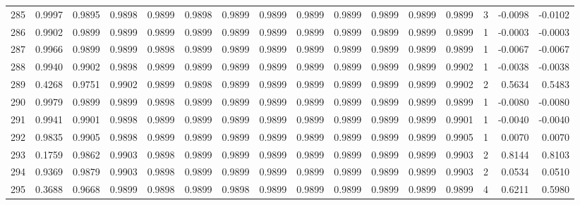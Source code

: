 \begin{tabular}{lrrrrrrrrrrrrrrr}
285 &      0.9997 &  0.9895 &  0.9898 &  0.9899 &  0.9898 &  0.9899 &  0.9899 &  0.9899 &  0.9899 &  0.9899 &   0.9899 &     0.9899 &      3 &                   -0.0098 &                    -0.0102 \\
286 &      0.9902 &  0.9899 &  0.9899 &  0.9899 &  0.9899 &  0.9899 &  0.9899 &  0.9899 &  0.9899 &  0.9899 &   0.9899 &     0.9899 &      1 &                   -0.0003 &                    -0.0003 \\
287 &      0.9966 &  0.9899 &  0.9899 &  0.9898 &  0.9899 &  0.9899 &  0.9899 &  0.9899 &  0.9899 &  0.9899 &   0.9899 &     0.9899 &      1 &                   -0.0067 &                    -0.0067 \\
288 &      0.9940 &  0.9902 &  0.9898 &  0.9899 &  0.9899 &  0.9899 &  0.9899 &  0.9899 &  0.9899 &  0.9899 &   0.9899 &     0.9902 &      1 &                   -0.0038 &                    -0.0038 \\
289 &      0.4268 &  0.9751 &  0.9902 &  0.9899 &  0.9898 &  0.9899 &  0.9899 &  0.9899 &  0.9899 &  0.9899 &   0.9899 &     0.9902 &      2 &                    0.5634 &                     0.5483 \\
290 &      0.9979 &  0.9899 &  0.9899 &  0.9898 &  0.9899 &  0.9899 &  0.9899 &  0.9899 &  0.9899 &  0.9899 &   0.9899 &     0.9899 &      1 &                   -0.0080 &                    -0.0080 \\
291 &      0.9941 &  0.9901 &  0.9898 &  0.9899 &  0.9899 &  0.9899 &  0.9899 &  0.9899 &  0.9899 &  0.9899 &   0.9899 &     0.9901 &      1 &                   -0.0040 &                    -0.0040 \\
292 &      0.9835 &  0.9905 &  0.9898 &  0.9899 &  0.9899 &  0.9899 &  0.9899 &  0.9899 &  0.9899 &  0.9899 &   0.9899 &     0.9905 &      1 &                    0.0070 &                     0.0070 \\
293 &      0.1759 &  0.9862 &  0.9903 &  0.9898 &  0.9899 &  0.9899 &  0.9899 &  0.9899 &  0.9899 &  0.9899 &   0.9899 &     0.9903 &      2 &                    0.8144 &                     0.8103 \\
294 &      0.9369 &  0.9879 &  0.9903 &  0.9898 &  0.9899 &  0.9899 &  0.9899 &  0.9899 &  0.9899 &  0.9899 &   0.9899 &     0.9903 &      2 &                    0.0534 &                     0.0510 \\
295 &      0.3688 &  0.9668 &  0.9899 &  0.9898 &  0.9899 &  0.9898 &  0.9899 &  0.9899 &  0.9899 &  0.9899 &   0.9899 &     0.9899 &      4 &                    0.6211 &                     0.5980 \\

\end{tabular}
